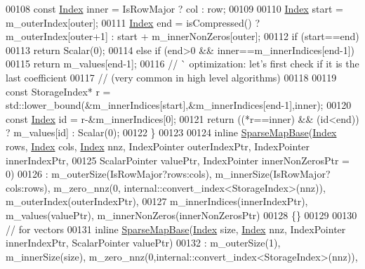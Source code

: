 \begin{DoxyCode}
00108       \textcolor{keyword}{const} \hyperlink{group___core___module_a554f30542cc2316add4b1ea0a492ff02}{Index} inner = IsRowMajor ? col : row;
00109 
00110       \hyperlink{group___core___module_a554f30542cc2316add4b1ea0a492ff02}{Index} start = m\_outerIndex[outer];
00111       \hyperlink{group___core___module_a554f30542cc2316add4b1ea0a492ff02}{Index} end = isCompressed() ? m\_outerIndex[outer+1] : start + m\_innerNonZeros[outer];
00112       \textcolor{keywordflow}{if} (start==end)
00113         \textcolor{keywordflow}{return} Scalar(0);
00114       \textcolor{keywordflow}{else} \textcolor{keywordflow}{if} (end>0 && inner==m\_innerIndices[end-1])
00115         \textcolor{keywordflow}{return} m\_values[end-1];
00116       \textcolor{comment}{// ^^  optimization: let's first check if it is the last coefficient}
00117       \textcolor{comment}{// (very common in high level algorithms)}
00118 
00119       \textcolor{keyword}{const} StorageIndex* r = std::lower\_bound(&m\_innerIndices[start],&m\_innerIndices[end-1],inner);
00120       \textcolor{keyword}{const} \hyperlink{group___core___module_a554f30542cc2316add4b1ea0a492ff02}{Index} \textcolor{keywordtype}{id} = r-&m\_innerIndices[0];
00121       \textcolor{keywordflow}{return} ((*r==inner) && (\textcolor{keywordtype}{id}<end)) ? m\_values[id] : Scalar(0);
00122     \}
00123 
00124     \textcolor{keyword}{inline} \hyperlink{class_eigen_1_1_sparse_map_base}{SparseMapBase}(\hyperlink{group___core___module_a554f30542cc2316add4b1ea0a492ff02}{Index} rows, \hyperlink{group___core___module_a554f30542cc2316add4b1ea0a492ff02}{Index} cols, \hyperlink{group___core___module_a554f30542cc2316add4b1ea0a492ff02}{Index} nnz, IndexPointer 
      outerIndexPtr, IndexPointer innerIndexPtr,
00125                               ScalarPointer valuePtr, IndexPointer innerNonZerosPtr = 0)
00126       : m\_outerSize(IsRowMajor?rows:cols), m\_innerSize(IsRowMajor?cols:rows), m\_zero\_nnz(0,
      internal::convert\_index<StorageIndex>(nnz)), m\_outerIndex(outerIndexPtr),
00127         m\_innerIndices(innerIndexPtr), m\_values(valuePtr), m\_innerNonZeros(innerNonZerosPtr)
00128     \{\}
00129 
00130     \textcolor{comment}{// for vectors}
00131     \textcolor{keyword}{inline} \hyperlink{class_eigen_1_1_sparse_map_base}{SparseMapBase}(\hyperlink{group___core___module_a554f30542cc2316add4b1ea0a492ff02}{Index} size, \hyperlink{group___core___module_a554f30542cc2316add4b1ea0a492ff02}{Index} nnz, IndexPointer innerIndexPtr, 
      ScalarPointer valuePtr)
00132       : m\_outerSize(1), m\_innerSize(size), m\_zero\_nnz(0,internal::convert\_index<StorageIndex>(nnz)), 

\end{DoxyCode}
